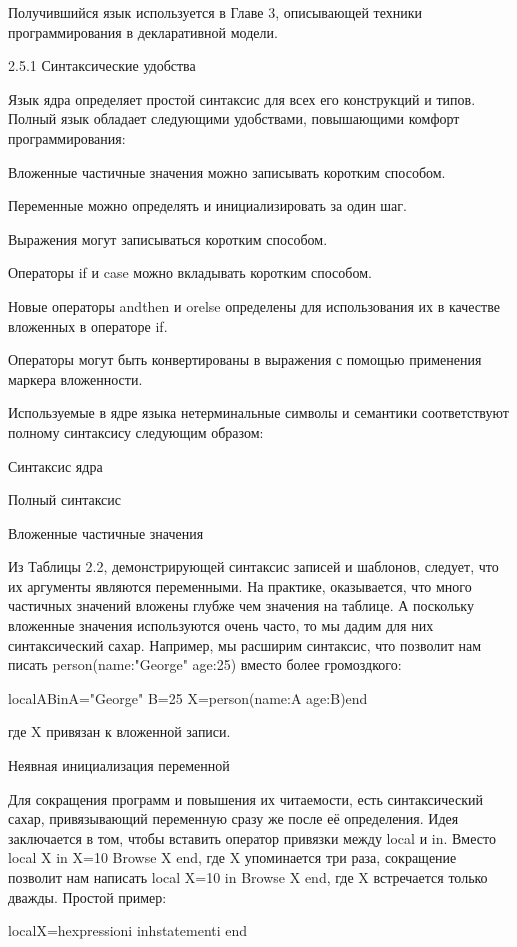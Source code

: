 Получившийся язык используется в Главе 3, описывающей техники программирования в декларативной модели.

2.5.1 Синтаксические удобства

Язык ядра определяет простой синтаксис для всех его конструкций и типов. Полный язык обладает следующими удобствами, повышающими комфорт программирования:

Вложенные частичные значения можно записывать коротким способом.

Переменные можно определять и инициализировать за один шаг.

Выражения могут записываться коротким способом.

Операторы if и case можно вкладывать коротким способом.

Новые операторы andthen и orelse определены для использования их в качестве вложенных в операторе if.

Операторы могут быть конвертированы в выражения с помощью применения маркера вложенности.

Используемые в ядре языка нетерминальные символы и семантики соответствуют полному синтаксису следующим образом:

Синтаксис ядра

Полный синтаксис

Вложенные частичные значения

Из Таблицы 2.2, демонстрирующей синтаксис записей и шаблонов, следует, что их аргументы являются переменными. На практике, оказывается, что много частичных значений вложены глубже чем значения на таблице. А поскольку вложенные значения используются очень часто, то мы дадим для них синтаксический сахар. Например, мы расширим синтаксис, что позволит нам писать person(name:"George" age:25) вместо более громоздкого:

localABinA="George" B=25 X=person(name:A age:B)end

где X привязан к вложенной записи.

Неявная инициализация переменной

Для сокращения программ и повышения их читаемости, есть синтаксический сахар, привязывающий переменную сразу же после её определения. Идея заключается в том, чтобы вставить оператор привязки между local и in. Вместо local X in X=10 {Browse X} end, где X упоминается три раза, сокращение позволит нам написать local X=10 in {Browse X} end, где X встречается только дважды. Простой пример:

localX=hexpressioni inhstatementi end

